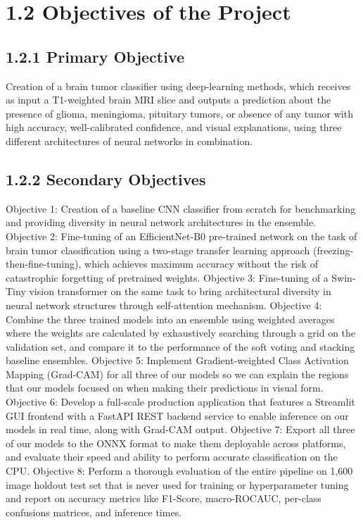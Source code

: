\documentclass[12pt,a4paper,oneside]{report}
\begin{document}
\section*{1.2 Objectives of the Project}
\subsection*{1.2.1 Primary Objective}
Creation of a brain tumor classifier using deep-learning methods, which receives as input a T1-weighted brain MRI slice and outputs a prediction about the presence of glioma, meningioma, pituitary tumors, or absence of any tumor with high accuracy, well-calibrated confidence, and visual explanations, using three different architectures of neural networks in combination.
\subsection*{1.2.2 Secondary Objectives}
Objective 1: Creation of a baseline CNN classifier from scratch for benchmarking and providing diversity in neural network architectures in the ensemble.
Objective 2: Fine-tuning of an EfficientNet-B0 pre-trained network on the task of brain tumor classification using a two-stage transfer learning approach (freezing-then-fine-tuning), which achieves maximum accuracy without the risk of catastrophic forgetting of pretrained weights.
Objective 3: Fine-tuning of a Swin-Tiny vision transformer on the same task to bring architectural diversity in neural network structures through self-attention mechanism.
Objective 4: Combine the three trained models into an ensemble using weighted averages where the weights are calculated by exhaustively searching through a grid on the validation set, and compare it to the performance of the soft voting and stacking baseline ensembles.
Objective 5: Implement Gradient-weighted Class Activation Mapping (Grad-CAM) for all three of our models so we can explain the regions that our models focused on when making their predictions in visual form.
Objective 6: Develop a full-scale production application that features a Streamlit GUI frontend with a FastAPI REST backend service to enable inference on our models in real time, along with Grad-CAM output.
Objective 7: Export all three of our models to the ONNX format to make them deployable across platforms, and evaluate their speed and ability to perform accurate classification on the CPU.
Objective 8: Perform a thorough evaluation of the entire pipeline on 1,600 image holdout test set that is never used for training or hyperparameter tuning and report on accuracy metrics like F1-Score, macro-ROCAUC, per-class confusions matrices, and inference times.
\end{document}

